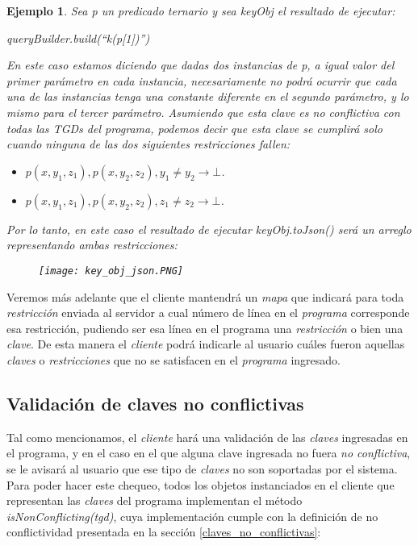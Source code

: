 \documentclass[11pt,a4paper,twoside]{tesis}
\newtheorem{exmp}{Ejemplo}
\begin{document}
\begin{exmp}
Sea \textit{p} un predicado ternario y sea \textit{keyObj} el resultado de ejecutar:

\begin{center}
   \textit{queryBuilder.build(``k(p[1])'')} 
\end{center}

En este caso estamos diciendo que dadas dos instancias de \textit{p}, a igual valor del primer parámetro en cada instancia, necesariamente no podrá ocurrir que cada una de las instancias tenga una constante diferente en el segundo parámetro, y lo mismo para el tercer parámetro. Asumiendo que esta \textit{clave} es no conflictiva con todas las \textit{TGDs} del  \textit{programa}, podemos decir que esta \textit{clave} se cumplirá solo cuando ninguna de las dos siguientes \textit{restricciones} fallen:


\begin{itemize}
    \item \textit{$p(x, y_1, z_1), p(x, y_2, z_2), y_1 \neq y_2 \rightarrow \bot$.}
    \item \textit{$p(x, y_1, z_1), p(x, y_2, z_2), z_1 \neq z_2 \rightarrow  \bot$.}
\end{itemize}

Por lo tanto, en este caso el resultado de ejecutar \textit{keyObj.toJson()} será un arreglo representando ambas \textit{restricciones}:

\begin{figure}[ht]
    \texttt{[image: key\_obj\_json.PNG]}
    \centering
\end{figure}
\end{exmp}

Veremos más adelante que el cliente mantendrá un \textit{mapa} que indicará para toda \textit{restricción} enviada al servidor a cual número de línea en el \textit{programa} corresponde esa restricción, pudiendo ser esa línea en el programa una \textit{restricción} o bien una \textit{clave}. De esta manera el \textit{cliente} podrá indicarle al usuario cuáles fueron aquellas \textit{claves} o \textit{restricciones} que no se satisfacen en el \textit{programa} ingresado.

\subsection{Validación de claves no conflictivas}
Tal como mencionamos, el \textit{cliente} hará una validación de las \textit{claves} ingresadas en el programa, y en el caso en el que alguna clave ingresada no fuera \textit{no conflictiva}, se le avisará al usuario que ese tipo de \textit{claves} no son soportadas por el sistema. Para poder hacer este chequeo, todos los objetos instanciados en el cliente que representan las \textit{claves} del programa implementan el método \textit{isNonConflicting(tgd)}, cuya implementación cumple con la definición de no conflictividad presentada en la sección \ref{claves_no_conflictivas}: 
\end{document}
